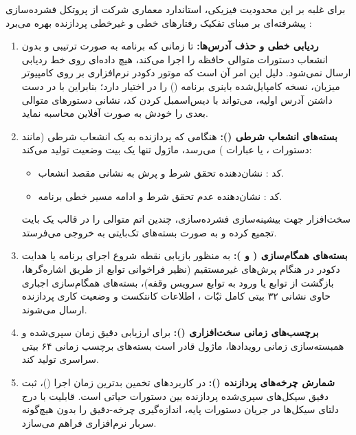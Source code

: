 برای غلبه بر این محدودیت فیزیکی، استاندارد معماری  شرکت  از پروتکل فشرده‌سازی پیشرفته‌ای بر مبنای تفکیک رفتارهای خطی و غیرخطی پردازنده بهره می‌برد \cite{armetmv42017}:
\begin{enumerate}
    \item \textbf{ردیابی خطی و حذف آدرس‌ها:} تا زمانی که برنامه به صورت ترتیبی و بدون انشعاب دستورات متوالی حافظه را اجرا می‌کند، هیچ داده‌ای روی خط ردیابی ارسال نمی‌شود. دلیل این امر آن است که موتور دکودر نرم‌افزاری بر روی کامپیوتر میزبان، نسخه کامپایل‌شده باینری برنامه () را در اختیار دارد؛ بنابراین با در دست داشتن آدرس اولیه، می‌تواند با دیس‌اسمبل کردن کد، نشانی دستورهای متوالی بعدی را خودش به صورت آفلاین محاسبه نماید.
    \item \textbf{بسته‌های انشعاب شرطی ():} هنگامی که پردازنده به یک انشعاب شرطی (مانند دستورات ،  یا عبارات ) می‌رسد، ماژول  تنها یک بیت وضعیت تولید می‌کند:
    \begin{itemize}
        \item کد : نشان‌دهنده تحقق شرط و پرش به نشانی مقصد انشعاب.
        \item کد : نشان‌دهنده عدم تحقق شرط و ادامه مسیر خطی برنامه.
    \end{itemize}
    سخت‌افزار  جهت بیشینه‌سازی فشرده‌سازی، چندین اتم متوالی را در قالب یک بایت تجمیع کرده و به صورت بسته‌های تک‌بایتی به خروجی می‌فرستد.
    \item \textbf{بسته‌های همگام‌سازی ( و ):} به منظور بازیابی نقطه شروع اجرای برنامه یا هدایت دکودر در هنگام پرش‌های غیرمستقیم (نظیر فراخوانی توابع از طریق اشاره‌گرها، بازگشت از توابع یا ورود به توابع سرویس وقفه)، بسته‌های همگام‌سازی اجباری حاوی نشانی ۳۲ بیتی کامل ثبّات ، اطلاعات کانتکست و وضعیت کاری پردازنده ارسال می‌شوند.
    \item \textbf{برچسب‌های زمانی سخت‌افزاری ():} برای ارزیابی دقیق زمان سپری‌شده و همبسته‌سازی زمانی رویدادها، ماژول  قادر است بسته‌های برچسب زمانی ۶۴ بیتی سراسری تولید کند.
    \item \textbf{شمارش چرخه‌های پردازنده ():} در کاربردهای تخمین بدترین زمان اجرا ()، ثبت دقیق سیکل‌های سپری‌شده پردازنده بین دستورات حیاتی است. قابلیت  با درج دلتای سیکل‌ها در جریان دستورات پایه، اندازه‌گیری چرخه-دقیق را بدون هیچ‌گونه سربار نرم‌افزاری فراهم می‌سازد.
\end{enumerate}

